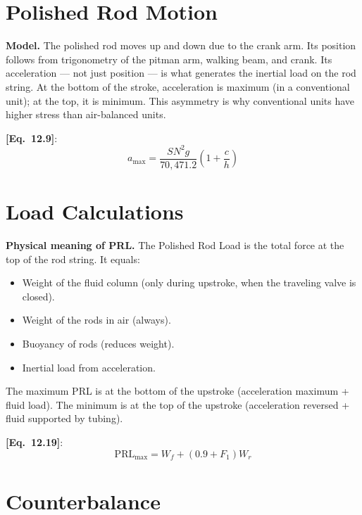 \documentclass[11pt,a4paper,openany]{book}
\newcommand{\eqrefbook}[1]{\textcolor{blue!60!black}{\textbf{[Eq.~#1]}}}
\begin{document}
\section{Polished Rod Motion}

\begin{theory}
\textbf{Model.} The polished rod moves up and down due to the crank
arm. Its position follows from trigonometry of the pitman arm, walking
beam, and crank. Its acceleration — not just position — is what
generates the inertial load on the rod string. At the bottom of the
stroke, acceleration is maximum (in a conventional unit); at the top,
it is minimum. This asymmetry is why conventional units have higher
stress than air-balanced units.
\end{theory}

\eqrefbook{12.9}:
\begin{equation}
  a_{\max} = \frac{S N^2 g}{70{,}471.2}\left(1 + \frac{c}{h}\right)
\end{equation}

\section{Load Calculations}

\begin{theory}
\textbf{Physical meaning of PRL.} The Polished Rod Load is the total
force at the top of the rod string. It equals:
\begin{itemize}
  \item Weight of the fluid column (only during upstroke, when the
        traveling valve is closed).
  \item Weight of the rods in air (always).
  \item Buoyancy of rods (reduces weight).
  \item Inertial load from acceleration.
\end{itemize}

The maximum PRL is at the bottom of the upstroke (acceleration maximum
+ fluid load). The minimum is at the top of the upstroke (acceleration
reversed + fluid supported by tubing).
\end{theory}

\eqrefbook{12.19}:
\begin{equation}
  \mathrm{PRL}_{\max} = W_f + (0.9 + F_1)W_r
\end{equation}

\section{Counterbalance}
\end{document}
